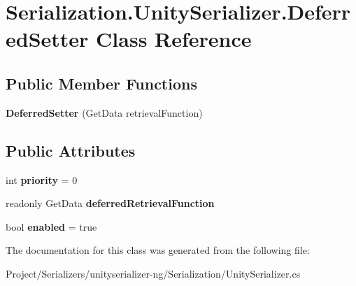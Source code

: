 \hypertarget{class_serialization_1_1_unity_serializer_1_1_deferred_setter}{}\section{Serialization.\+Unity\+Serializer.\+Deferred\+Setter Class Reference}
\label{class_serialization_1_1_unity_serializer_1_1_deferred_setter}
\subsection*{Public Member Functions}
\begin{DoxyCompactItemize}
\item 
\mbox{\label{class_serialization_1_1_unity_serializer_1_1_deferred_setter_a5a4ece5260d24868a8beb674ada150dd}} 
{\bfseries Deferred\+Setter} (Get\+Data retrieval\+Function)
\end{DoxyCompactItemize}
\subsection*{Public Attributes}
\begin{DoxyCompactItemize}
\item 
\mbox{\label{class_serialization_1_1_unity_serializer_1_1_deferred_setter_ab5f7f3dd9252c8ec009307041c97f3c4}} 
int {\bfseries priority} = 0
\item 
\mbox{\label{class_serialization_1_1_unity_serializer_1_1_deferred_setter_a94ee05c1cdd9b7569f15960446a37e88}} 
readonly Get\+Data {\bfseries deferred\+Retrieval\+Function}
\item 
\mbox{\label{class_serialization_1_1_unity_serializer_1_1_deferred_setter_a961e4fd57df2a9953490423766553f9f}} 
bool {\bfseries enabled} = true
\end{DoxyCompactItemize}


The documentation for this class was generated from the following file\+:\begin{DoxyCompactItemize}
\item 
Project/\+Serializers/unityserializer-\/ng/\+Serialization/Unity\+Serializer.\+cs\end{DoxyCompactItemize}
